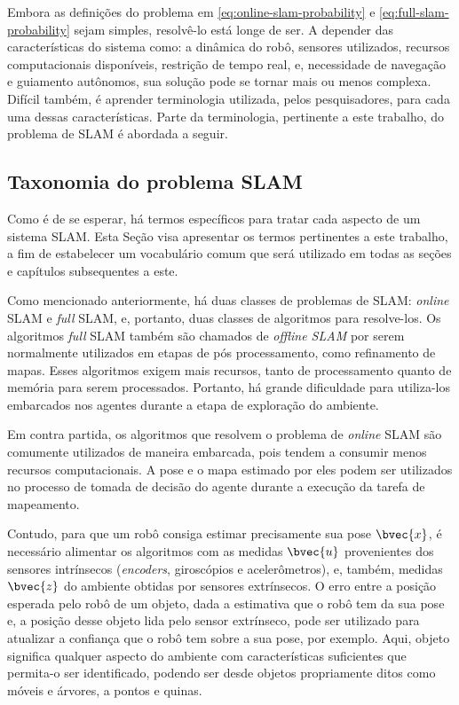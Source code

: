 Embora as definições do problema em \ref{eq:online-slam-probability} e 
\ref{eq:full-slam-probability} sejam simples, resolvê-lo está longe de ser. 
A depender das características do sistema como: a dinâmica do robô, sensores utilizados, recursos computacionais disponíveis, restrição de tempo real, e, 
necessidade de navegação e guiamento autônomos, sua solução pode se tornar mais 
ou menos complexa. Difícil também, é aprender terminologia utilizada, pelos 
pesquisadores, para cada uma dessas características. Parte da terminologia, 
pertinente a este trabalho, do problema de SLAM é abordada a seguir.

\subsection*{Taxonomia do problema SLAM}
Como é de se esperar, há termos específicos para tratar cada aspecto de um 
sistema SLAM. Esta Seção visa apresentar os termos pertinentes a este trabalho, 
a fim de estabelecer um vocabulário comum que será utilizado em todas as seções 
e capítulos subsequentes a este.

Como mencionado anteriormente, há duas classes de problemas de SLAM: 
\textit{online} SLAM e \textit{full} SLAM, e, portanto, duas classes de 
algoritmos para resolve-los. Os algoritmos \textit{full} SLAM também são chamados 
de \emph{offline SLAM} por serem normalmente utilizados em etapas de pós 
processamento, como refinamento de mapas. Esses algoritmos exigem mais 
recursos, tanto de processamento quanto de memória para serem processados. 
Portanto, há grande dificuldade para utiliza-los embarcados nos agentes durante 
a etapa de exploração do ambiente.

Em contra partida, os algoritmos que resolvem o problema de \textit{online} 
SLAM são comumente utilizados de maneira embarcada, pois tendem a 
consumir menos recursos computacionais. A pose e o mapa estimado por eles podem 
ser utilizados no processo de tomada de decisão do agente durante a execução da 
tarefa de mapeamento. 

Contudo, para que um robô consiga estimar precisamente sua pose $\bvec{x}$, é 
necessário alimentar os algoritmos com as medidas $\bvec{u}$ provenientes dos 
sensores intrínsecos (\textit{encoders}, giroscópios e acelerômetros), e, 
também, medidas $\bvec{z}$ do ambiente obtidas por sensores extrínsecos. O erro 
entre a posição esperada pelo robô de um objeto, dada a estimativa que o robô tem da sua pose e, a posição desse objeto lida pelo sensor extrínseco, pode ser 
utilizado para atualizar a confiança que o robô tem sobre a sua pose, por 
exemplo. Aqui, objeto significa qualquer aspecto do ambiente com características 
suficientes que permita-o ser identificado, podendo ser desde objetos
propriamente ditos como móveis e árvores, a pontos e quinas.

